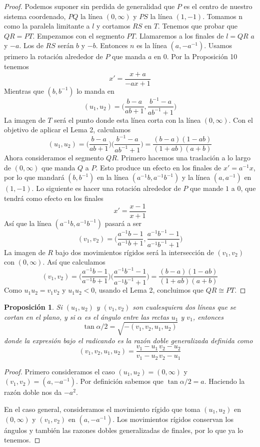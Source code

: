 \documentclass[a4paper]{amsart}
\theoremstyle{plain}
\newtheorem{proposition}{Proposición}
\begin{document}
\begin{proof}
Podemos suponer sin perdida de generalidad que $P$ es el centro de nuestro sistema coordenado, $PQ$ la línea $(0,\infty)$ y $PS$ la línea $(1,-1)$. Tomamos n como la paralela limitante a $l$ y cortamos $RS$ en $T$. Tenemos que probar que $QR=PT$.
Empezamos con el segmento $PT$. Llamaremos a los finales de $l=QR$ $a$ y $-a$. Los de $RS$ serán $b$ y $-b$. Entonces $n$ es la línea $(a,-a^{-1})$. Usamos primero la rotación alrededor de $P$ que manda $a$ en $0$. Por la Proposición 10 tenemos 
\[
x'=\frac{x+a}{-ax+1}
\]
Mientras que $(b,b^{-1})$ lo manda en 
\[
(u_1,u_2)=\Big(\frac{b-a}{ab+1},\frac{b^{-1}-a}{ab^{-1}+1}\Big)
\]
La imagen de $T$ será el punto donde esta línea corta con la línea $(0,\infty)$. Con el objetivo de aplicar el Lema 2, calculamos
\[
(u_1,u_2)=\Big(\frac{b-a}{ab+1}\Big)\Big(\frac{b^{-1}-a}{ab^{-1}+1}\Big)=\frac{(b-a)(1-ab)}{(1+ab)(a+b)}
\]
Ahora consideramos el segmento $QR$. Primero hacemos una traslación a lo largo de $(0,\infty)$ que manda $Q$ a $P$. Esto produce un efecto en los finales de $x'=a^{-1}x$, por lo que mandará $(b,b^{-1})$ en la línea $(a^{-1}b,a^{-1}b^{-1})$ y la línea $(a,a^{-1})$ en $(1,-1)$. 
Lo siguiente es hacer una rotación alrededor de $P$ que mande $1$ a $0$, que tendrá como efecto en los finales
\[
x'=\frac{x-1}{x+1}
\]
Así que la línea $(a^{-1}b,a^{-1}b^{-1})$ pasará a ser
\[
(v_1,v_2)=\Big(\frac{a^{-1}b-1}{a^{-1}b+1},\frac{a^{-1}b^{-1}-1}{a^{-1}b^{-1}+1}\Big)
\]
La imagen de $R$ bajo dos movimientos rígidos será la intersección de $(v_1,v_2)$ con $(0,\infty)$. Así que calculamos
\[
(v_1,v_2)=\Big(\frac{a^{-1}b-1}{a^{-1}b+1}\Big)\Big(\frac{a^{-1}b^{-1}-1}{a^{-1}b^{-1}+1}\Big)=\frac{(b-a)(1-ab)}{(1+ab)(a+b)}
\]
Como $u_1u_2=v_1v_2$ y $u_1u_2<0$, usando el Lema 2, concluimos que $QR\cong PT$.
\end{proof}

\begin{proposition}
Si $(u_1,u_2)$ y $(v_1,v_2)$ son cualesquiera dos líneas que se cortan en el plano, y si $\alpha$ es el ángulo entre las rectas $u_1$ y $v_1$, entonces
\[
\tan \alpha/2=\sqrt{-(v_1,v_2,u_1,u_2)}
\]
donde la expresión bajo el radicando es la razón doble generalizada definida como
\[
(v_1,v_2,u_1,u_2)=\frac{v_1-u_1}{v_1-u_2}\frac{v_2-u_2}{v_2-u_1}
\]
\end{proposition}

\begin{proof}
Primero consideramos el caso $(u_1,u_2)=(0,\infty)$ y $(v_1,v_2)=(a,-a^{-1})$. Por definición sabemos que $\tan \alpha/2=a$. Haciendo la razón doble nos da $-a^2$.

En el caso general, consideramos el movimiento rígido que toma $(u_1,u_2)$ en $(0,\infty)$ y $(v_1,v_2)$ en $(a,-a^{-1})$. Los movimientos rígidos conservan los ángulos y también las razones dobles generalizadas de finales, por lo que ya lo tenemos.
\end{proof}
\end{document}

